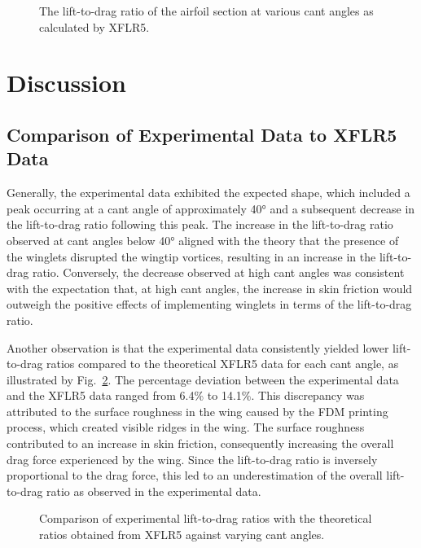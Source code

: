 \documentclass[journal,letterpaper]{IEEEtran}
\begin{document}
\begin{figure}[H]
    \centering
    
    \caption{The lift-to-drag ratio of the airfoil section at various cant angles as calculated by XFLR5.}
    \label{fig:Simu}
\end{figure}


\section{Discussion}

\subsection{Comparison of Experimental Data to XFLR5 Data}

Generally, the experimental data exhibited the expected shape, which included a peak occurring at a cant angle of approximately \ang{40} and a subsequent decrease in the lift-to-drag ratio following this peak.
The increase in the lift-to-drag ratio observed at cant angles below \ang{40} aligned with the theory that the presence of the winglets disrupted the wingtip vortices, resulting in an increase in the lift-to-drag ratio.
Conversely, the decrease observed at high cant angles was consistent with the expectation that, at high cant angles, the increase in skin friction would outweigh the positive effects of implementing winglets in terms of the lift-to-drag ratio.

Another observation is that the experimental data consistently yielded lower lift-to-drag ratios compared to the theoretical XFLR5 data for each cant angle, as illustrated by Fig.~\ref{fig:comp}.
The percentage deviation between the experimental data and the XFLR5 data ranged from 6.4\% to 14.1\%.
This discrepancy was attributed to the surface roughness in the wing caused by the FDM printing process, which created visible ridges in the wing.
The surface roughness contributed to an increase in skin friction, consequently increasing the overall drag force experienced by the wing.
Since the lift-to-drag ratio is inversely proportional to the drag force, this led to an underestimation of the overall lift-to-drag ratio as observed in the experimental data.

\begin{figure}[H]
    \centering
    
    \caption{Comparison of experimental lift-to-drag ratios with the theoretical ratios obtained from XFLR5 against varying cant angles.}
    \label{fig:comp}
\end{figure}
\end{document}
